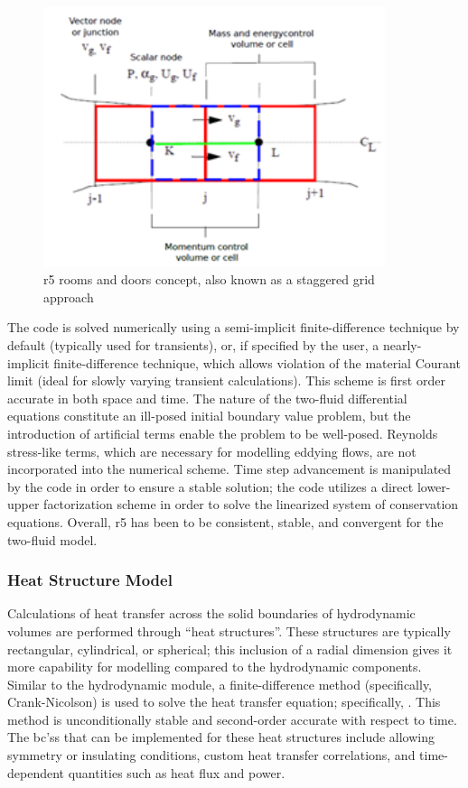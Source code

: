 \documentclass[double,12pt]{beavtex}
\begin{document}
\begin{figure}
    \begin{center}
    	\includegraphics[width=10cm]{Figures/RELAP_Room_Doors.png}
    	\caption{\acrshort{r5} rooms and doors concept, also known as a staggered grid approach}
    	\label{fig:RELAP_Room_Doors}
    	\end{center}
\end{figure}

The code is solved numerically using a semi-implicit finite-difference technique by default (typically used for transients), or, if specified by the user, a nearly-implicit finite-difference technique, which allows violation of the material Courant limit (ideal for slowly varying transient calculations). This scheme is first order accurate in both space and time. The nature of the two-fluid differential equations constitute an ill-posed initial boundary value problem, but the introduction of artificial terms enable the problem to be well-posed. Reynolds stress-like terms, which are necessary for modelling eddying flows, are not incorporated into the numerical scheme. Time step advancement is manipulated by the code in order to ensure a stable solution; the code utilizes a direct lower-upper factorization scheme in order to solve the linearized system of conservation equations. Overall, \acrshort{r5} has been to be consistent, stable, and convergent for the two-fluid model.

\subsubsection{Heat Structure Model}

Calculations of heat transfer across the solid boundaries of hydrodynamic volumes are performed through “heat structures”. These structures are typically rectangular, cylindrical, or spherical; this inclusion of a radial dimension gives it more capability for modelling compared to the hydrodynamic components. Similar to the hydrodynamic module, a finite-difference method (specifically, Crank-Nicolson) is used to solve the heat transfer equation; specifically, . This method is unconditionally stable and second-order accurate with respect to time. The \acrshort{bc}'ss that can be implemented for these heat structures include allowing symmetry or insulating conditions, custom heat transfer correlations, and time-dependent quantities such as heat flux and power.
\end{document}
